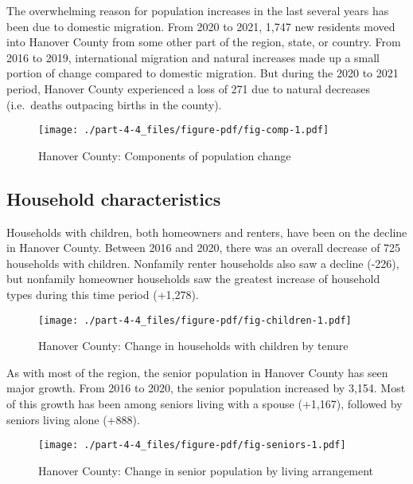 \documentclass[
  letterpaper,
  DIV=11,
  numbers=noendperiod]{scrreprt}
\begin{document}
The overwhelming reason for population increases in the last several
years has been due to domestic migration. From 2020 to 2021, 1,747 new
residents moved into Hanover County from some other part of the region,
state, or country. From 2016 to 2019, international migration and
natural increases made up a small portion of change compared to domestic
migration. But during the 2020 to 2021 period, Hanover County
experienced a loss of 271 due to natural decreases (i.e.~deaths
outpacing births in the county).

\begin{figure}

{\centering \texttt{[image: ./part-4-4\_files/figure-pdf/fig-comp-1.pdf]}

}

\caption{\label{fig-comp}Hanover County: Components of population
change}

\end{figure}

\hypertarget{household-characteristics-3}{%
\subsection{Household
characteristics}\label{household-characteristics-3}}

Households with children, both homeowners and renters, have been on the
decline in Hanover County. Between 2016 and 2020, there was an overall
decrease of 725 households with children. Nonfamily renter households
also saw a decline (-226), but nonfamily homeowner households saw the
greatest increase of household types during this time period (+1,278).

\begin{figure}

{\centering \texttt{[image: ./part-4-4\_files/figure-pdf/fig-children-1.pdf]}

}

\caption{\label{fig-children}Hanover County: Change in households with
children by tenure}

\end{figure}

As with most of the region, the senior population in Hanover County has
seen major growth. From 2016 to 2020, the senior population increased by
3,154. Most of this growth has been among seniors living with a spouse
(+1,167), followed by seniors living alone (+888).

\begin{figure}

{\centering \texttt{[image: ./part-4-4\_files/figure-pdf/fig-seniors-1.pdf]}

}

\caption{\label{fig-seniors}Hanover County: Change in senior population
by living arrangement}

\end{figure}
\end{document}
